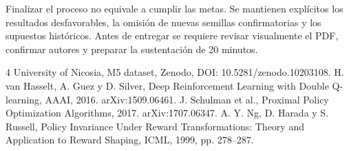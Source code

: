 \documentclass[conference]{IEEEtran}
\begin{document}
Finalizar el proceso no equivale a cumplir las metas. Se mantienen explícitos los resultados desfavorables, la omisión de nuevas semillas confirmatorias y los supuestos históricos. Antes de entregar se requiere revisar visualmente el PDF, confirmar autores y preparar la sustentación de 20 minutos.
\begin{thebibliography}{4}
 University of Nicosia, M5 dataset, Zenodo, DOI: 10.5281/zenodo.10203108.
 H. van Hasselt, A. Guez y D. Silver, Deep Reinforcement Learning with Double Q-learning, AAAI, 2016. arXiv:1509.06461.
 J. Schulman et al., Proximal Policy Optimization Algorithms, 2017. arXiv:1707.06347.
 A. Y. Ng, D. Harada y S. Russell, Policy Invariance Under Reward Transformations: Theory and Application to Reward Shaping, ICML, 1999, pp. 278--287.
\end{thebibliography}
\end{document}
